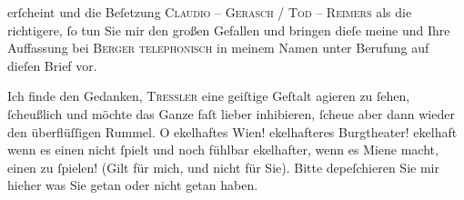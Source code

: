                erſcheint und die Beſetzung \textsc{Claudio – Gerasch} / \textsc{Tod – Reimers} als die richtigere,{ }ſo tun Sie mir den großen Gefallen und bringen dieſe meine
               und Ihre Auffassung bei \textsc{Berger}{ }{\pb}\textsc{telephonisch} in meinem Namen unter Berufung auf dieſen
               Brief vor.\pend
           
\pstart
           Ich finde den Gedanken, \textsc{Tressler} eine geiſtige Geſtalt
               agieren zu{ }ſehen,{ }ſcheußlich und möchte das Ganze faſt lieber inhibieren,{ }ſcheue aber
               dann wieder den {\pb}überflüſſigen
               Rummel. O ekelhaftes Wien! ekelhafteres Burgtheater! ekelhaft wenn es einen nicht{ }ſpielt
               und noch fühlbar ekelhafter, wenn es Miene macht, einen zu{ }ſpielen! (Gilt für mich,
               und nicht für Sie). Bitte depeſchieren Sie mir {\pb}hieher was Sie getan oder nicht
               getan haben.\pend
           
